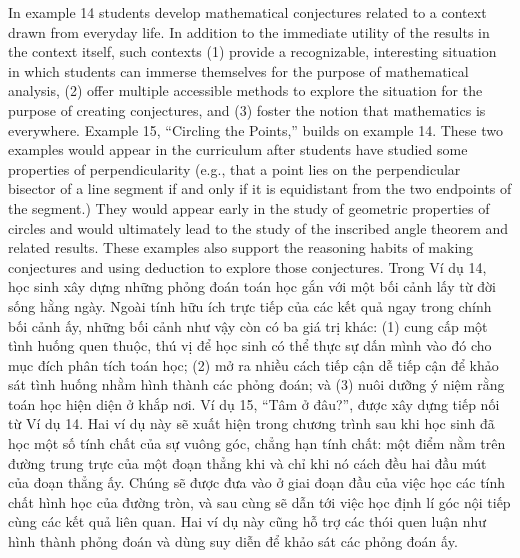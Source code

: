 \documentclass[
  10pt,
  a4paper,
  landscape,
  twoside,
  openany
]{scrbook}
\newcommand{\EN}[1]{#1}
\newcommand{\VI}[1]{#1}
\newcommand{\NOTE}[1]{#1}
\newcounter{example}
\begin{document}
\TriPara
{
\EN{In example 14 students develop mathematical conjectures related to a context drawn from everyday life. In addition to the immediate utility of the results in the context itself, such contexts (1) provide a recognizable, interesting situation in which students can immerse themselves for the purpose of mathematical analysis, (2) offer multiple accessible methods to explore the situation for the purpose of creating conjectures, and (3) foster the notion that mathematics is everywhere. Example 15, ``Circling the Points,'' builds on example 14. These two examples would appear in the curriculum after students have studied some properties of perpendicularity (e.g., that a point lies on the perpendicular bisector of a line segment if and only if it is equidistant from the two endpoints of the segment.) They would appear early in the study of geometric properties of circles and would ultimately lead to the study of the inscribed angle theorem and related results. These examples also support the reasoning habits of making conjectures and using deduction to explore those conjectures.}
}
{
\VI{Trong Ví dụ 14, học sinh xây dựng những phỏng đoán toán học gắn với một bối cảnh lấy từ đời sống hằng ngày. Ngoài tính hữu ích trực tiếp của các kết quả ngay trong chính bối cảnh ấy, những bối cảnh như vậy còn có ba giá trị khác: (1) cung cấp một tình huống quen thuộc, thú vị để học sinh có thể thực sự dấn mình vào đó cho mục đích phân tích toán học; (2) mở ra nhiều cách tiếp cận dễ tiếp cận để khảo sát tình huống nhằm hình thành các phỏng đoán; và (3) nuôi dưỡng ý niệm rằng toán học hiện diện ở khắp nơi. Ví dụ 15, ``Tâm ở đâu?'', được xây dựng tiếp nối từ Ví dụ 14. Hai ví dụ này sẽ xuất hiện trong chương trình sau khi học sinh đã học một số tính chất của sự vuông góc, chẳng hạn tính chất: một điểm nằm trên đường trung trực của một đoạn thẳng khi và chỉ khi nó cách đều hai đầu mút của đoạn thẳng ấy. Chúng sẽ được đưa vào ở giai đoạn đầu của việc học các tính chất hình học của đường tròn, và sau cùng sẽ dẫn tới việc học định lí góc nội tiếp cùng các kết quả liên quan. Hai ví dụ này cũng hỗ trợ các thói quen luận như hình thành phỏng đoán và dùng suy diễn để khảo sát các phỏng đoán ấy.}
}
{
\NOTE{}
}
\end{document}

